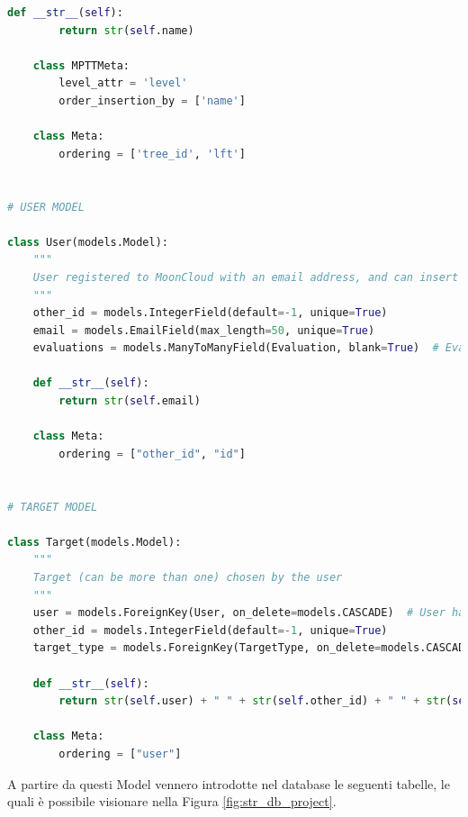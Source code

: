 \begin{lstlisting}[language=Python, label=lst:model, caption={Parti principali del codice dei Models della soluzione.}]
    def __str__(self):
        return str(self.name)

    class MPTTMeta:
        level_attr = 'level'
        order_insertion_by = ['name']

    class Meta:
        ordering = ['tree_id', 'lft']


# USER MODEL

class User(models.Model):
    """
    User registered to MoonCloud with an email address, and can insert Target and launch Evaluations
    """
    other_id = models.IntegerField(default=-1, unique=True)
    email = models.EmailField(max_length=50, unique=True)
    evaluations = models.ManyToManyField(Evaluation, blank=True)  # Evaluations chosen by user

    def __str__(self):
        return str(self.email)

    class Meta:
        ordering = ["other_id", "id"]


# TARGET MODEL

class Target(models.Model):
    """
    Target (can be more than one) chosen by the user
    """
    user = models.ForeignKey(User, on_delete=models.CASCADE)  # User has chosen a target_type
    other_id = models.IntegerField(default=-1, unique=True)
    target_type = models.ForeignKey(TargetType, on_delete=models.CASCADE)  # TargetType Id

    def __str__(self):
        return str(self.user) + " " + str(self.other_id) + " " + str(self.target_type)

    class Meta:
        ordering = ["user"]
\end{lstlisting}
%
A partire da questi Model vennero introdotte nel database le seguenti tabelle, le quali è possibile visionare nella Figura 
\ref{fig:str_db_project}.
